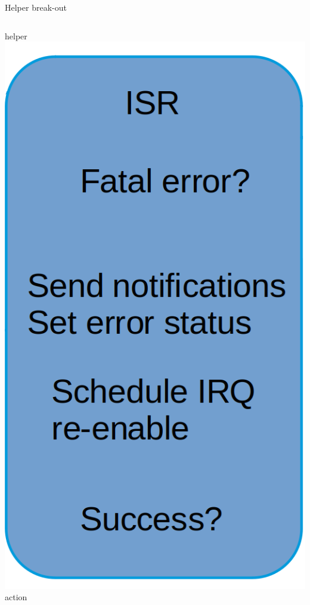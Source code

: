 \documentclass[10pt]{beamer}
\begin{document}
\begin{frame}[t]{Helper break-out}
\begin{columns}[onlytextwidth]
{	}
	helper
	\includegraphics[width=1\linewidth]{img/isr/helperbox_size.png}
	action \\[8pt]
\end{columns}
\end{frame}
\end{document}
